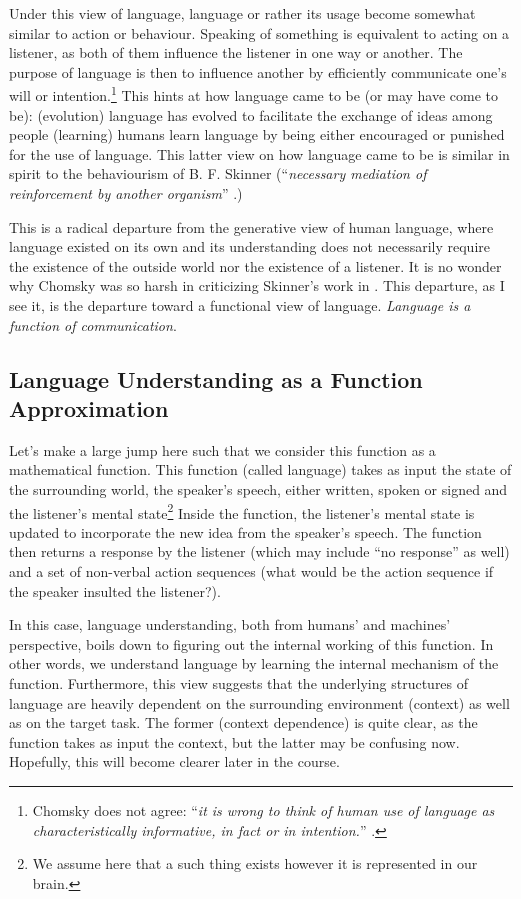 \documentclass{report}
\begin{document}
Under this view of language, language or rather its usage become somewhat
similar to action or behaviour. Speaking of something is equivalent to acting on
a listener, as both of them influence the listener in one way or another. The
purpose of language is then to influence another by efficiently communicate
one's will or intention.\footnote{
    Chomsky does not agree: ``{\it it is wrong to think of human use of language
    as characteristically informative, in fact or in intention.}''
    \cite{chomsky1968linguistic}.
} This hints at how language came to be (or may have come to be): (evolution)
language has evolved to facilitate the exchange of ideas among people (learning)
humans learn language by being either encouraged or punished for the use of
language. This latter view on how language came to be is similar in spirit to
the behaviourism of B. F. Skinner (``{\it necessary mediation of reinforcement by
another organism}'' \cite{skinner2014verbal}.)

This is a radical departure from the generative view of human language, where
language existed on its own and its understanding does not necessarily require
the existence of the outside world nor the existence of a listener. It is no
wonder why Chomsky was so harsh in criticizing Skinner's work in
\cite{chomsky1959review}. 
This departure, as I see it, is the departure toward a functional view of
language. {\it Language is a function of communication}. 

\subsection{Language Understanding as a Function Approximation}

Let's make a large jump here such that we consider this function as a
mathematical function.  This function (called language) takes as input the state
of the surrounding world, the speaker's speech, either written, spoken or signed
and the listener's mental state\footnote{
    We assume here that a such thing exists however it is represented in
    our brain.
} Inside the function, the listener's mental state is updated to incorporate the
new idea from the speaker's speech. The function then returns a response by the
listener (which may include ``no response'' as well) and a set of non-verbal
action sequences (what would be the action sequence if the speaker insulted
the listener?).

In this case, language understanding, both from humans' and machines'
perspective, boils down to figuring out the internal working of this function.
In other words, we understand language by learning the internal mechanism of the
function.  Furthermore, this view suggests that the underlying structures of
language are heavily dependent on the surrounding environment (context) as well
as on the target task. The former (context dependence) is quite clear, as the
function takes as input the context, but the latter may be confusing now.
Hopefully, this will become clearer later in the course.
\end{document}
